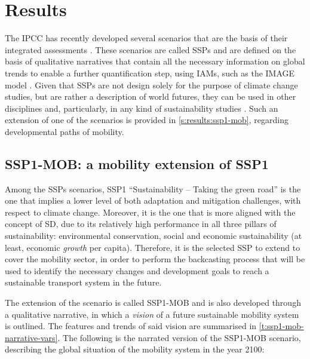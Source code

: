 \chapter{Results}
\label{c:results}

The \gls{IPCC} has recently developed several scenarios that are the basis of their integrated assessments \parencite{oneill2017_roadsaheadNarratives,vuuren2017_Energylanduse,fricko2017_markerquantificationShared,fujimori2017_SSP3AIMimplementation,calvin2017_SSP4worlddeepening,kriegler2017_Fossilfueleddevelopment}. These scenarios are called \glspl{SSP} and are defined on the basis of qualitative narratives that contain all the necessary information on global trends to enable a further quantification step, using \glspl{IAM}, such as the IMAGE model \parencite{vuuren2017_Energylanduse}. Given that \glspl{SSP} are not design solely for the purpose of climate change studies, but are rather a description of world futures, they can be used in other disciplines and, particularly, in any kind of sustainability studies \parencite{oneill2017_roadsaheadNarratives}. Such an extension of one of the scenarios is provided in \autoref{s:results:ssp1-mob}, regarding developmental paths of mobility.

\section{SSP1-MOB: a mobility extension of SSP1}
\label{s:results:ssp1-mob}

Among the \glspl{SSP} scenarios, SSP1 ``Sustainability -- Taking the green road'' is the one that implies a lower level of both adaptation and mitigation challenges, with respect to climate change. Moreover, it is the one that is more aligned with the concept of \gls{SD}, due to its relatively high performance in all three pillars of sustainability: environmental conservation, social and economic sustainability (at least, economic \textit{growth} per capita). Therefore, it is the selected \gls{SSP} to extend to cover the mobility sector, in order to perform the backcasting process that will be used to identify the necessary changes and development goals to reach a sustainable transport system in the future.

The extension of the scenario is called \gls{SSP1-MOB} and is also developed through a qualitative narrative, in which a \textit{vision} of a future sustainable mobility system is outlined. The features and trends of said vision are summarised in \autoref{t:ssp1-mob-narrative-vars}. The following is the narrated version of the \gls{SSP1-MOB} scenario, describing the global situation of the mobility system in the year 2100:

